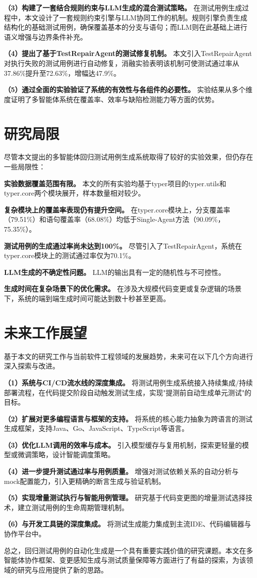 \textbf{（3）构建了一套结合规则约束与LLM生成的混合测试策略。} 在测试用例生成过程中，本文设计了一套规则约束引擎与LLM协同工作的机制。规则引擎负责生成结构化的基础测试用例，确保覆盖基本的分支与语句；而LLM则在此基础上进行语义增强与边界条件补充。

\textbf{（4）提出了基于TestRepairAgent的测试修复机制。} 本文引入TestRepairAgent对执行失败的测试用例进行自动修复，消融实验表明该机制可使测试通过率从37.86\%提升至72.63\%，增幅达47.9\%。

\textbf{（5）通过全面的实验验证了系统的有效性与各组件的必要性。} 实验结果从多个维度证明了多智能体系统在覆盖率、效率与缺陷检测能力等方面的优势。

\section{研究局限}

尽管本文提出的多智能体回归测试用例生成系统取得了较好的实验效果，但仍存在一些局限性：

\textbf{实验数据覆盖范围有限。} 本文的所有实验均基于typer项目的typer.utils和typer.core两个模块展开，样本数量相对较少。

\textbf{复杂模块上的覆盖率表现仍有提升空间。} 在typer.core模块上，分支覆盖率（79.51\%）和语句覆盖率（68.08\%）均低于Single-Agent方法（90.09\%，75.35\%）。

\textbf{测试用例的生成通过率尚未达到100\%。} 尽管引入了TestRepairAgent，系统在typer.core模块上的测试通过率仅为70.1\%。

\textbf{LLM生成的不确定性问题。} LLM的输出具有一定的随机性与不可控性。

\textbf{生成时间在复杂场景下的优化需求。} 在涉及大规模代码变更或复杂逻辑的场景下，系统的端到端生成时间可能达到数十秒甚至更高。

\section{未来工作展望}

基于本文的研究工作与当前软件工程领域的发展趋势，未来可在以下几个方向进行深入探索与改进。

\textbf{（1）系统与CI/CD流水线的深度集成。} 将测试用例生成系统接入持续集成/持续部署流程，在代码提交阶段自动触发测试生成，实现"提测前自动生成单元测试"的目标。

\textbf{（2）扩展对更多编程语言与框架的支持。} 将系统的核心能力抽象为跨语言的测试生成框架，支持Java、Go、JavaScript、TypeScript等语言。

\textbf{（3）优化LLM调用的效率与成本。} 引入模型缓存与复用机制，探索更轻量的模型或微调策略，设计智能调度策略。

\textbf{（4）进一步提升测试通过率与用例质量。} 增强对测试依赖关系的自动分析与mock配置能力，引入更精确的断言生成与验证机制。

\textbf{（5）实现增量测试执行与智能用例管理。} 研究基于代码变更图的增量测试选择技术，建立测试用例的生命周期管理机制。

\textbf{（6）与开发工具链的深度集成。} 将测试生成能力集成到主流IDE、代码编辑器与协作平台中。

总之，回归测试用例的自动化生成是一个具有重要实践价值的研究课题。本文在多智能体协作框架、变更感知生成与测试质量保障等方面进行了有益的探索，为该领域的研究与应用提供了新的思路。
